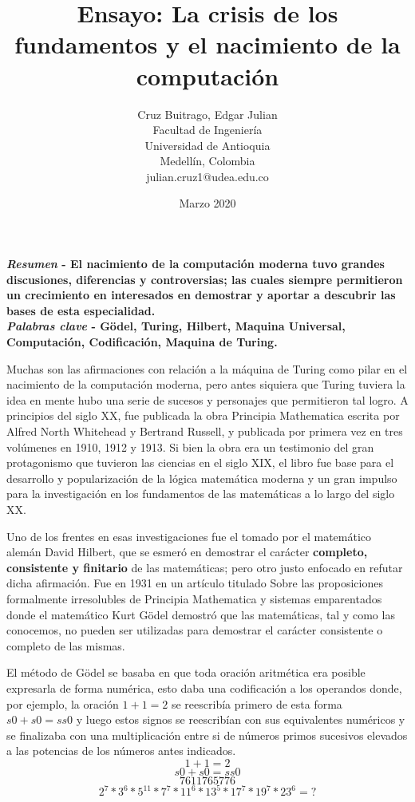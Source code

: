 \documentclass{article}
\title{Ensayo: La crisis de los fundamentos y el nacimiento de la computación}
\author{Cruz Buitrago, Edgar Julian \\ Facultad de Ingeniería \\ 
        Universidad de Antioquia \\ Medellín, Colombia \\
        julian.cruz1@udea.edu.co}
\date{Marzo 2020}
\begin{document}
\maketitle
\begin{multicols}{2}
    \justify
        \textbf{\textit{Resumen} - El nacimiento de la computación moderna tuvo grandes discusiones, diferencias y controversias; las cuales siempre permitieron un crecimiento en interesados en demostrar y aportar a descubrir las bases de esta especialidad.}
        \textbf{\\ \textit{Palabras clave} - Gödel, Turing, Hilbert, Maquina Universal, Computación, Codificación, Maquina de Turing.} 
        
        \vspace{\baselineskip}
    
        Muchas son las afirmaciones con relación a la máquina de Turing como pilar en el nacimiento de la computación moderna, pero antes siquiera que Turing tuviera la idea en mente hubo una serie de sucesos y personajes que permitieron tal logro. A principios del siglo XX, fue publicada la obra Principia Mathematica escrita por Alfred North Whitehead y Bertrand Russell, y publicada por primera vez en tres volúmenes en 1910, 1912 y 1913. Si bien la obra era un testimonio del gran protagonismo que tuvieron las ciencias en el siglo XIX, el libro fue base para el desarrollo y popularización de la lógica matemática moderna y un gran impulso para la investigación en los fundamentos de las matemáticas a lo largo del siglo XX.\cite{principia}
        
        \vspace{\baselineskip}
        
        Uno de los frentes en esas investigaciones fue el tomado por el matemático alemán David Hilbert, que se esmeró en demostrar el carácter \textbf{completo, consistente y finitario} de las matemáticas; pero otro justo enfocado en refutar dicha afirmación.\cite{bbva}  Fue en 1931 en un artículo titulado {Sobre las proposiciones formalmente irresolubles de Principia Mathematica y sistemas emparentados} donde el matemático Kurt Gödel demostró que las matemáticas, tal y como las conocemos, no pueden ser utilizadas para demostrar el carácter consistente o completo de las mismas.
        
        \vspace{\baselineskip}
        
        El método de Gödel se basaba en que toda oración aritmética era posible expresarla de forma numérica, esto daba una {codificación} a los operandos donde, por ejemplo, la oración \(1 + 1 = 2\) se reescribía primero de esta forma \(s0 + s0 = ss0\) y luego estos signos se reescribían con sus equivalentes numéricos y se finalizaba con una multiplicación entre si de números primos sucesivos elevados a las potencias de los números antes indicados.
        \[1 + 1 = 2\]
        \[s0 + s0 = ss0\]
        \[76 11 76 5 776\]
        \[2^7 * 3^6 * 5^11 * 7^7 * 11^6 * 13^5 * 17^7 * 19^7 * 23^6 = ?\]
        

\end{multicols}
\end{document}
